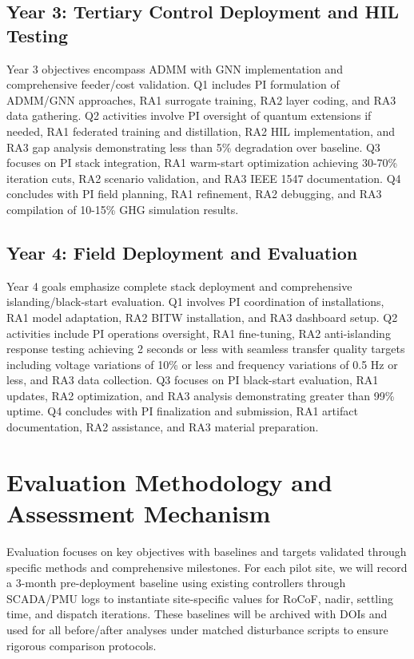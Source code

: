 \documentclass[12pt]{article}
\begin{document}
\subsection{Year 3: Tertiary Control Deployment and HIL Testing}

Year 3 objectives encompass ADMM with GNN implementation and comprehensive feeder/cost validation. Q1 includes PI formulation of ADMM/GNN approaches, RA1 surrogate training, RA2 layer coding, and RA3 data gathering. Q2 activities involve PI oversight of quantum extensions if needed, RA1 federated training and distillation, RA2 HIL implementation, and RA3 gap analysis demonstrating less than 5\% degradation over baseline. Q3 focuses on PI stack integration, RA1 warm-start optimization achieving 30-70\% iteration cuts, RA2 scenario validation, and RA3 IEEE 1547 documentation. Q4 concludes with PI field planning, RA1 refinement, RA2 debugging, and RA3 compilation of 10-15\% GHG simulation results.

\subsection{Year 4: Field Deployment and Evaluation}

Year 4 goals emphasize complete stack deployment and comprehensive islanding/black-start evaluation. Q1 involves PI coordination of installations, RA1 model adaptation, RA2 BITW installation, and RA3 dashboard setup. Q2 activities include PI operations oversight, RA1 fine-tuning, RA2 anti-islanding response testing achieving 2 seconds or less with seamless transfer quality targets including voltage variations of 10\% or less and frequency variations of 0.5 Hz or less, and RA3 data collection. Q3 focuses on PI black-start evaluation, RA1 updates, RA2 optimization, and RA3 analysis demonstrating greater than 99\% uptime. Q4 concludes with PI finalization and submission, RA1 artifact documentation, RA2 assistance, and RA3 material preparation.

\section{Evaluation Methodology and Assessment Mechanism}

Evaluation focuses on key objectives with baselines and targets validated through specific methods and comprehensive milestones. For each pilot site, we will record a 3-month pre-deployment baseline using existing controllers through SCADA/PMU logs to instantiate site-specific values for RoCoF, nadir, settling time, and dispatch iterations. These baselines will be archived with DOIs and used for all before/after analyses under matched disturbance scripts to ensure rigorous comparison protocols.
\end{document}
